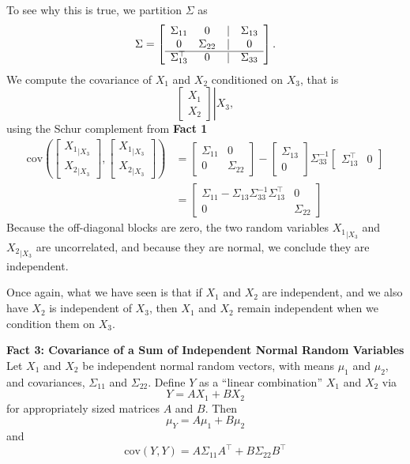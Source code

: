 \documentclass[letterpaper]{article}
\newcommand{\cov}{\mathrm{cov}}
\begin{document}
To see why this is true, we partition $\Sigma$ as
 $$ \Sigma = \left[ \begin{array}{cccc} \Sigma_{11} & 0 & |& \Sigma_{13} \\ 0 & \Sigma_{22} & | & 0 \\
 \cline{1-4}
  \Sigma_{13}^\top & 0 &| & \Sigma_{33} \end{array}  \right].$$
 We compute the covariance of $X_1$ and $X_2$ conditioned on $X_3$, that is
 $$ \left. \begin{bmatrix} X_1 \\ X_2  \end{bmatrix} \right| {X_3}, $$
using the Schur complement from \textbf{Fact 1}
\begin{align*} \cov( \begin{bmatrix} {X_1}_{|X_3} \\ {X_2}_{|X_3}  \end{bmatrix} ,  \begin{bmatrix} {X_1}_{|X_3} \\ {X_2}_{|X_3}  \end{bmatrix}) &=  \left[ \begin{array}{cc} \Sigma_{11} & 0 \\ 0 & \Sigma_{22} \end{array}  \right] -  \left[ \begin{array}{c} \Sigma_{13} \\ 0 \end{array}  \right] \Sigma_{33}^{-1} \left[ \begin{array}{cc} \Sigma_{13}^\top & 0 \end{array}  \right]\\
&= \left[ \begin{array}{cc} \Sigma_{11} - \Sigma_{13}\Sigma_{33}^{-1} \Sigma_{13}^\top & 0 \\ 0 & \Sigma_{22} \end{array}  \right]
\end{align*}
Because the off-diagonal blocks are zero, the two random variables ${X_1}_{|X_3}$ and  ${X_2}_{|X_3}$ are uncorrelated, and because they are normal, we conclude they are independent.

Once again, what we have seen is that if $X_1$ and $X_2$ are independent, and we also have $X_2$ is independent of $X_3$, then $X_1$ and $X_2$ remain independent when we condition them on $X_3$.

\newpage

\textbf{Fact 3: Covariance of a Sum of Independent Normal Random Variables} Let $X_1$ and $X_2$ be independent normal random vectors, with means $\mu_1$ and $\mu_2$, and covariances, $\Sigma_{11}$ and $\Sigma_{22}$. Define $Y$ as a ``linear combination'' $X_1$ and $X_2$ via
 $$Y=A X_1 + BX_2$$
 for appropriately sized matrices $A$ and $B$. Then
 $$\mu_Y = A \mu_1 + B \mu_2$$
 and
 $$\cov(Y,Y) = A\Sigma_{11} A^\top + B \Sigma_{22} B^\top$$
\end{document}
